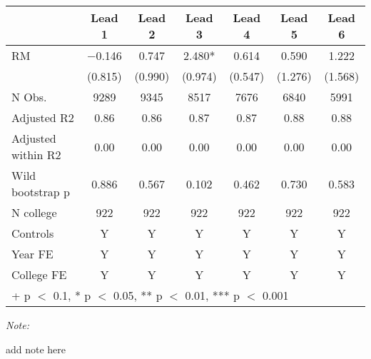 \begin{table}
\centering
\begin{threeparttable}
\begin{tabular}[t]{lcccccc}
\toprule
  & Lead 1 & Lead 2 & Lead 3 & Lead 4 & Lead 5 & Lead 6\\
\midrule
RM & \num{-0.146} & \num{0.747} & \num{2.480}* & \num{0.614} & \num{0.590} & \num{1.222}\\
 & (\num{0.815}) & (\num{0.990}) & (\num{0.974}) & (\num{0.547}) & (\num{1.276}) & (\num{1.568})\\
\midrule
N Obs. & \num{9289} & \num{9345} & \num{8517} & \num{7676} & \num{6840} & \num{5991}\\
Adjusted R2 & \num{0.86} & \num{0.86} & \num{0.87} & \num{0.87} & \num{0.88} & \num{0.88}\\
Adjusted within R2 & \num{0.00} & \num{0.00} & \num{0.00} & \num{0.00} & \num{0.00} & \num{0.00}\\
Wild bootstrap p & 0.886 & 0.567 & 0.102 & 0.462 & 0.730 & 0.583\\
N college & 922 & 922 & 922 & 922 & 922 & 922\\
Controls & Y & Y & Y & Y & Y & Y\\
Year FE & Y & Y & Y & Y & Y & Y\\
College FE & Y & Y & Y & Y & Y & Y\\
\bottomrule
\multicolumn{7}{l}{\rule{0pt}{1em}+ p $<$ 0.1, * p $<$ 0.05, ** p $<$ 0.01, *** p $<$ 0.001}\\
\end{tabular}
\begin{tablenotes}
\item \textit{Note: } 
\item add note here
\end{tablenotes}
\end{threeparttable}
\end{table}
